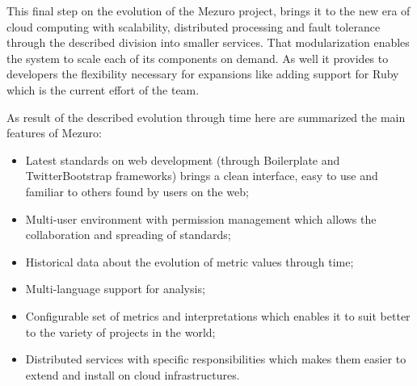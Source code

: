 This final step on the evolution of the Mezuro project, brings it to the new era of cloud computing with scalability, distributed processing and fault tolerance through the described division into smaller services. That modularization enables the system to scale each of its components on demand. As well it provides to developers the flexibility necessary for expansions like adding support for Ruby which is the current effort of the team.

As result of the described evolution through time here are summarized the main features of Mezuro:

\begin{itemize}
  \item Latest standards on web development (through Boilerplate and TwitterBootstrap frameworks) brings a clean interface, easy to use and familiar to others found by users on the web;
  \item Multi-user environment with permission management which allows the collaboration and spreading of standards;
  \item Historical data about the evolution of metric values through time;
  \item Multi-language support for analysis;
  \item Configurable set of metrics and interpretations which enables it to suit better to the variety of projects in the world;
  \item Distributed services with specific responsibilities which makes them easier to extend and install on cloud infrastructures.
\end{itemize}